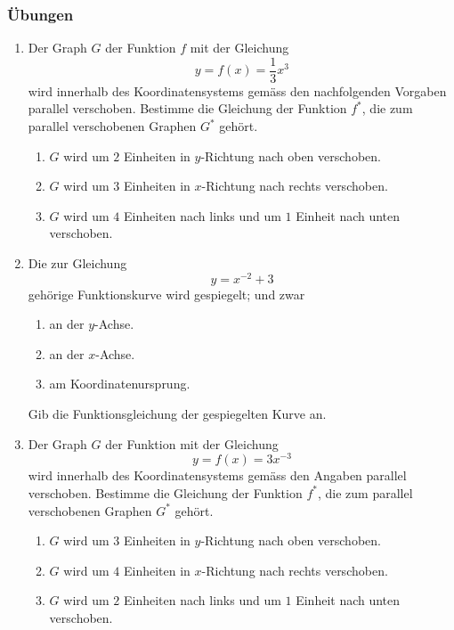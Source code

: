 \subsubsection{Übungen}
\begin{enumerate}

    \item
          Der Graph $G$ der Funktion $f$ mit der Gleichung
          \[
              y = f(x) = \frac{1}{3}x^3
          \]
          wird innerhalb des Koordinatensystems gemäss den nachfolgenden Vorgaben parallel verschoben.
          Bestimme die Gleichung der Funktion $f^*$, die zum parallel verschobenen Graphen $G^*$ gehört.

          \begin{enumerate}[label=\alph*)]
              \item $G$ wird um $2$ Einheiten in $y$-Richtung nach oben verschoben.
              \item $G$ wird um $3$ Einheiten in $x$-Richtung nach rechts verschoben.
              \item $G$ wird um $4$ Einheiten nach links und um $1$ Einheit nach unten verschoben.
          \end{enumerate}


    \item
          Die zur Gleichung
          \[
              y = x^{-2} + 3
          \]
          gehörige Funktionskurve wird gespiegelt; und zwar

          \begin{enumerate}[label=\alph*)]
              \item an der $y$-Achse.
              \item an der $x$-Achse.
              \item am Koordinatenursprung.
          \end{enumerate}

          Gib die Funktionsgleichung der gespiegelten Kurve an.


    \item
          Der Graph $G$ der Funktion mit der Gleichung
          \[
              y = f(x) = 3x^{-3}
          \]
          wird innerhalb des Koordinatensystems gemäss den Angaben parallel verschoben.
          Bestimme die Gleichung der Funktion $f^*$, die zum parallel verschobenen Graphen $G^*$ gehört.

          \begin{enumerate}[label=\alph*)]
              \item $G$ wird um $3$ Einheiten in $y$-Richtung nach oben verschoben.
              \item $G$ wird um $4$ Einheiten in $x$-Richtung nach rechts verschoben.
              \item $G$ wird um $2$ Einheiten nach links und um $1$ Einheit nach unten verschoben.
          \end{enumerate}



\end{enumerate}
